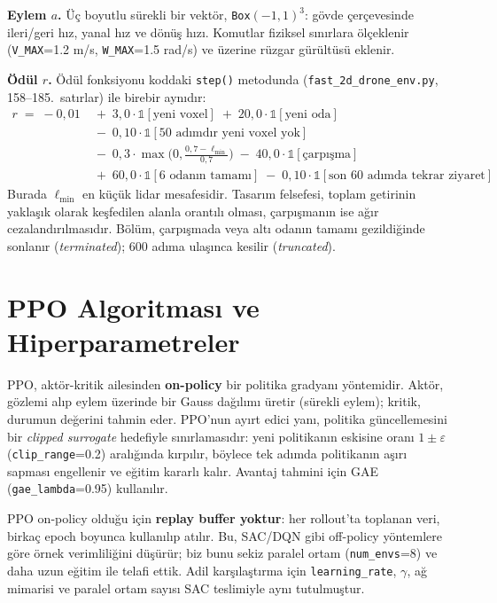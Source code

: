 \documentclass[11pt,a4paper]{article}
\newcommand{\reff}[1]{\texttt{#1}}
\begin{document}
\textbf{Eylem $a$.} Üç boyutlu sürekli bir vektör, \reff{Box}$(-1,1)^3$: gövde
çerçevesinde ileri/geri hız, yanal hız ve dönüş hızı. Komutlar fiziksel sınırlara
ölçeklenir (\reff{V\_MAX}=1.2 m/s, \reff{W\_MAX}=1.5 rad/s) ve üzerine rüzgar
gürültüsü eklenir.

\textbf{Ödül $r$.} Ödül fonksiyonu koddaki \reff{step()} metodunda
(\reff{fast\_2d\_drone\_env.py}, 158--185.\ satırlar) ile birebir aynıdır:
\begin{align*}
r \;=\; -0{,}01
&\;+\; 3{,}0\cdot \mathbb{1}[\text{yeni voxel}]
\;+\; 20{,}0\cdot \mathbb{1}[\text{yeni oda}]\\
&\;-\; 0{,}10\cdot \mathbb{1}[\text{50 adımdır yeni voxel yok}]\\
&\;-\; 0{,}3\cdot \max\!\Big(0,\tfrac{0{,}7-\ell_{\min}}{0{,}7}\Big)
\;-\; 40{,}0\cdot \mathbb{1}[\text{çarpışma}]\\
&\;+\; 60{,}0\cdot \mathbb{1}[\text{6 odanın tamamı}]
\;-\; 0{,}10\cdot \mathbb{1}[\text{son 60 adımda tekrar ziyaret}]
\end{align*}
Burada $\ell_{\min}$ en küçük lidar mesafesidir. Tasarım felsefesi, toplam getirinin
yaklaşık olarak keşfedilen alanla orantılı olması, çarpışmanın ise ağır
cezalandırılmasıdır. Bölüm, çarpışmada veya altı odanın tamamı gezildiğinde
sonlanır (\emph{terminated}); 600 adıma ulaşınca kesilir (\emph{truncated}).

\section{PPO Algoritması ve Hiperparametreler}
PPO, aktör-kritik ailesinden \textbf{on-policy} bir politika gradyanı yöntemidir.
Aktör, gözlemi alıp eylem üzerinde bir Gauss dağılımı üretir (sürekli eylem); kritik,
durumun değerini tahmin eder. PPO'nun ayırt edici yanı, politika güncellemesini bir
\emph{clipped surrogate} hedefiyle sınırlamasıdır: yeni politikanın eskisine oranı
$1\pm\varepsilon$ (\reff{clip\_range}=0.2) aralığında kırpılır, böylece tek adımda
politikanın aşırı sapması engellenir ve eğitim kararlı kalır. Avantaj tahmini için
GAE (\reff{gae\_lambda}=0.95) kullanılır.

PPO on-policy olduğu için \textbf{replay buffer yoktur}: her rollout'ta toplanan veri,
birkaç epoch boyunca kullanılıp atılır. Bu, SAC/DQN gibi off-policy yöntemlere göre
örnek verimliliğini düşürür; biz bunu sekiz paralel ortam (\reff{num\_envs}=8) ve daha
uzun eğitim ile telafi ettik. Adil karşılaştırma için \reff{learning\_rate}, $\gamma$,
ağ mimarisi ve paralel ortam sayısı SAC teslimiyle aynı tutulmuştur.
\end{document}

